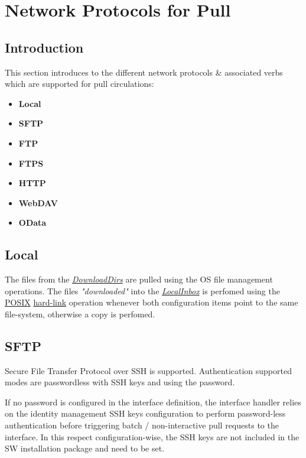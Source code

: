 \documentclass[dec_sum_main.tex]{subfiles}
\begin{document}
\section{Network Protocols for Pull}

\subsection{Introduction}
This section introduces to the different network protocols \& associated verbs which are supported for pull circulations:

\begin{itemize}
	\item \textbf{Local}
	\item \textbf{SFTP}
	\item \textbf{FTP}
	\item \textbf{FTPS}
	\item \textbf{HTTP}
	\item \textbf{WebDAV}
	\item \textbf{OData}
\end{itemize}

\subsection{Local}
The files from the \hyperref[DownloadDirs]{\textit{DownloadDirs}} are 
pulled using the OS file management operations. 
The files \textit{"downloaded"} into the \hyperref[LocalInbox]{\textit{LocalInbox}} is perfomed using the \hyperlink{https://en.wikipedia.org/wiki/POSIX}{POSIX} \hyperlink{https://en.wikipedia.org/wiki/Hard_link}{hard-link} operation whenever both configuration items point to the same file-system, otherwise a copy is perfomed.

\subsection{SFTP}
Secure File Transfer Protocol over SSH is supported. Authentication supported modes are passwordless with SSH keys and using the password. \newline

\par \noindent
If no password is configured in the interface definition, the interface handler relies on the identity management SSH keys configuration to perform password-less authentication before triggering batch / non-interactive pull requests to the interface. In this respect configuration-wise, the SSH keys are not included in the SW installation package and need to be set.
\end{document}
